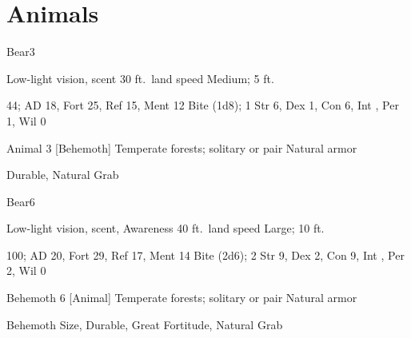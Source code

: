 \section{Animals}

    \begin{monsection}[Black]{Bear}{3}
        \begin{spellcontent}
            \begin{spelltargetinginfo}
                \pari {} Low-light vision, scent
                \pari {} 30 ft.\ land speed
                \pari {} Medium;  5 ft.
            \end{spelltargetinginfo}
            \begin{spelleffects}
                \pari {} 44;  AD 18, Fort 25, Ref 15, Ment 12
                \pari {} Bite  (1d8);  1
                \pari {} Str 6, Dex 1, Con 6, Int , Per 1, Wil 0
            \end{spelleffects}
        \end{spellcontent}
        \begin{spellfooter}
            \pari {} Animal 3 [Behemoth]
            \pari {} Temperate forests; solitary or pair
            \pari {} Natural armor 
        \end{spellfooter}
    \end{monsection}
     Durable, Natural Grab

    \begin{monsection}[Brown]{Bear}{6}
        \begin{spellcontent}
            \begin{spelltargetinginfo}
                \pari {} Low-light vision, scent, Awareness 
                \pari {} 40 ft.\ land speed
                \pari {} Large;  10 ft.
            \end{spelltargetinginfo}
            \begin{spelleffects}
                \pari {} 100;  AD 20, Fort 29, Ref 17, Ment 14
                \pari {} Bite  (2d6);  2
                \pari {} Str 9, Dex 2, Con 9, Int , Per 2, Wil 0
            \end{spelleffects}
        \end{spellcontent}
        \begin{spellfooter}
            \pari {} Behemoth 6 [Animal]
            \pari {} Temperate forests; solitary or pair
            \pari {} Natural armor 
        \end{spellfooter}
    \end{monsection}
     Behemoth Size, Durable, Great Fortitude, Natural Grab
